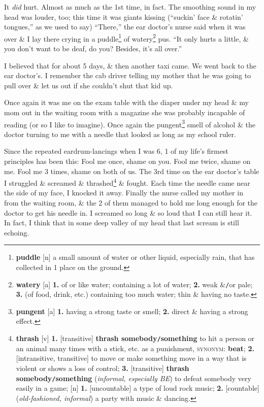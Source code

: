 \documentclass[oneside]{book}
\numberwithin{equation}{section}
\begin{document}
It \textit{did} hurt. Almost as much as the 1st time, in fact. The smoothing sound in my head was louder, too; this time it was giants kissing (``suckin' face \& rotatin' tongues,'' as we used to say) ``There,'' the ear doctor's nurse said when it was over \& I lay there crying in a puddle\footnote{\textbf{puddle} [n] a small amount of water or other liquid, especially rain, that has collected in 1 place on the ground.} of watery\footnote{\textbf{watery} [a] \textbf{1.} of or like water; containing a lot of water; \textbf{2.} weak \&\texttt{/}or pale; \textbf{3.} (of food, drink, etc.) containing too much water; thin \& having no taste.} pus. ``It only hurts a little, \& you don't want to be deaf, do you? Besides, it's all over.''

I believed that for about 5 days, \& then another taxi came. We went back to the ear doctor's. I remember the cab driver telling my mother that he was going to pull over \& let us out if she couldn't shut that kid up.

Once again it was me on the exam table with the diaper under my head \& my mom out in the waiting room with a magazine she was probably incapable of reading (or so I like to imagine). Once again the pungent\footnote{\textbf{pungent} [a] \textbf{1.} having a strong taste or smell; \textbf{2.} direct \& having a strong effect.} smell of alcohol \& the doctor turning to me with a needle that looked as long as my school ruler.

Since the repeated eardrum-lancings when I was 6, 1 of my life's firmest principles has been this: Fool me once, shame on you. Fool me twice, shame on me. Fool me 3 times, shame on both of us. The 3rd time on the ear doctor's table I struggled \& screamed \& thrashed\footnote{\textbf{thrash} [v] \textbf{1.} [transitive] \textbf{thrash somebody\texttt{/}something} to hit a person or an animal many times with a stick, etc. as a punishment, \textsc{synonym}: \textbf{beat}; \textbf{2.} [intransitive, transitive] to move or make something move in a way that is violent or shows a loss of control; \textbf{3.} [transitive] \textbf{thrash somebody\texttt{/}something} (\textit{informal, especially BE}) to defeat somebody very easily in a game; [n] \textbf{1.} [uncountable] a type of loud rock music; \textbf{2.} [countable] (\textit{old-fashioned, informal}) a party with music \& dancing.} \& fought. Each time the needle came near the side of my face, I knocked it away. Finally the nurse called my mother in from the waiting room, \& the 2 of them managed to hold me long enough for the doctor to get his needle in. I screamed so long \& so loud that I can still hear it. In fact, I think that in some deep valley of my head that last scream is still echoing.
\end{document}
